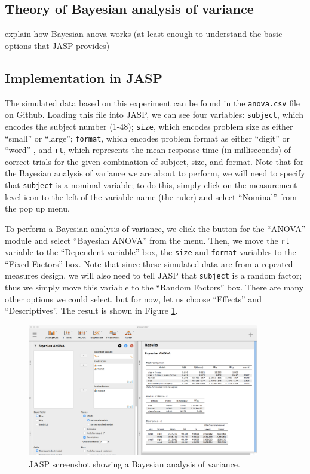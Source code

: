 \documentclass[english,,doc,floatsintext]{apa6}
\begin{document}
\hypertarget{theory-of-bayesian-analysis-of-variance}{%
\subsection{Theory of Bayesian analysis of variance}\label{theory-of-bayesian-analysis-of-variance}}

explain how Bayesian anova works (at least enough to understand the basic options that JASP provides)

\hypertarget{implementation-in-jasp-2}{%
\subsection{Implementation in JASP}\label{implementation-in-jasp-2}}

The simulated data based on this experiment can be found in the \texttt{anova.csv} file on Github. Loading this file into JASP, we can see four variables: \texttt{subject}, which encodes the subject number (1-48); \texttt{size}, which encodes problem size as either ``small'' or ``large''; \texttt{format}, which encodes problem format as either ``digit'' or ``word'' , and \texttt{rt}, which represents the mean response time (in milliseconds) of correct trials for the given combination of subject, size, and format. Note that for the Bayesian analysis of variance we are about to perform, we will need to specify that \texttt{subject} is a nominal variable; to do this, simply click on the measurement level icon to the left of the variable name (the ruler) and select ``Nominal'' from the pop up menu.

To perform a Bayesian analysis of variance, we click the button for the ``ANOVA'' module and select ``Bayesian ANOVA'' from the menu. Then, we move the \texttt{rt} variable to the ``Dependent variable'' box, the \texttt{size} and \texttt{format} variables to the ``Fixed Factors'' box. Note that since these simulated data are from a repeated measures design, we will also need to tell JASP that \texttt{subject} is a random factor; thus we simply move this variable to the ``Random Factors'' box. There are many other options we could select, but for now, let us choose ``Effects'' and ``Descriptives''. The result is shown in Figure \ref{fig:anovaBayes}.

\begin{figure}
\centering
\includegraphics[width=0.9\textwidth,height=\textheight]{figures/anovaBayes.png}
\caption{\label{fig:anovaBayes}JASP screenshot showing a Bayesian analysis of variance.}
\end{figure}
\end{document}
